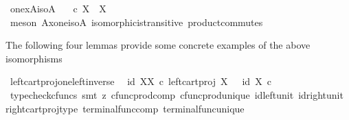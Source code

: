 \begin{isabellebody}
\endisatagproof
{\isafoldproof}%
%
\isadelimproof
\isanewline
%
\endisadelimproof
\isanewline
{}\isamarkupfalse%
\ one{\isacharunderscore}{\kern0pt}x{\isacharunderscore}{\kern0pt}A{\isacharunderscore}{\kern0pt}iso{\isacharunderscore}{\kern0pt}A{\isacharcolon}{\kern0pt}\isanewline
\ \ {\isachardoublequoteopen}{\isasymone}\ {\isasymtimes}\isactrlsub c\ X\ {\isasymcong}\ X{\isachardoublequoteclose}\isanewline
%
\isadelimproof
\ \ %
\endisadelimproof
%
\isatagproof
{}\isamarkupfalse%
\ {\isacharparenleft}{\kern0pt}meson\ A{\isacharunderscore}{\kern0pt}x{\isacharunderscore}{\kern0pt}one{\isacharunderscore}{\kern0pt}iso{\isacharunderscore}{\kern0pt}A\ isomorphic{\isacharunderscore}{\kern0pt}is{\isacharunderscore}{\kern0pt}transitive\ product{\isacharunderscore}{\kern0pt}commutes{\isacharparenright}{\kern0pt}%
\endisatagproof
{\isafoldproof}%
%
\isadelimproof
%
\endisadelimproof
%
\begin{isamarkuptext}%
The following four lemmas provide some concrete examples of the above isomorphisms%
\end{isamarkuptext}\isamarkuptrue%
\isamarkupfalse%
\ left{\isacharunderscore}{\kern0pt}cart{\isacharunderscore}{\kern0pt}proj{\isacharunderscore}{\kern0pt}one{\isacharunderscore}{\kern0pt}left{\isacharunderscore}{\kern0pt}inverse{\isacharcolon}{\kern0pt}\isanewline
\ \ {\isachardoublequoteopen}{\isasymlangle}id\ X{\isacharcomma}{\kern0pt}{\isasymbeta}\isactrlbsub X\isactrlesub {\isasymrangle}\ {\isasymcirc}\isactrlsub c\ left{\isacharunderscore}{\kern0pt}cart{\isacharunderscore}{\kern0pt}proj\ X\ {\isasymone}\ {\isacharequal}{\kern0pt}\ id\ {\isacharparenleft}{\kern0pt}X\ {\isasymtimes}\isactrlsub c\ {\isasymone}{\isacharparenright}{\kern0pt}{\isachardoublequoteclose}\isanewline
%
\isadelimproof
\ \ %
\endisadelimproof
%
\isatagproof
{}\isamarkupfalse%
\ {\isacharparenleft}{\kern0pt}typecheck{\isacharunderscore}{\kern0pt}cfuncs{\isacharcomma}{\kern0pt}\ smt\ {\isacharparenleft}{\kern0pt}z{}{\isacharparenright}{\kern0pt}\ cfunc{\isacharunderscore}{\kern0pt}prod{\isacharunderscore}{\kern0pt}comp\ cfunc{\isacharunderscore}{\kern0pt}prod{\isacharunderscore}{\kern0pt}unique\ id{\isacharunderscore}{\kern0pt}left{\isacharunderscore}{\kern0pt}unit{}\ id{\isacharunderscore}{\kern0pt}right{\isacharunderscore}{\kern0pt}unit{}\ right{\isacharunderscore}{\kern0pt}cart{\isacharunderscore}{\kern0pt}proj{\isacharunderscore}{\kern0pt}type\ terminal{\isacharunderscore}{\kern0pt}func{\isacharunderscore}{\kern0pt}comp\ terminal{\isacharunderscore}{\kern0pt}func{\isacharunderscore}{\kern0pt}unique{\isacharparenright}{\kern0pt}%

\end{isabellebody}
